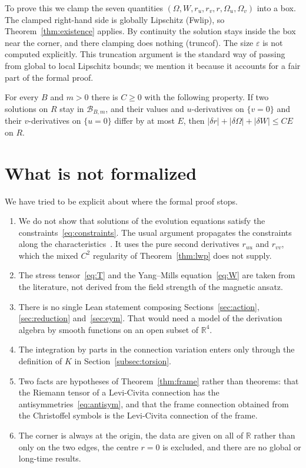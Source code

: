 \documentclass{lmcs}
\DeclareRobustCommand{\lean}[1]{{\ttfamily\def\_{\textunderscore\allowbreak}#1}}
\newcommand{\R}{\mathbb{R}}
\begin{document}
To prove this we clamp the seven quantities $(\Omega,W,r_u,r_v,r,\Omega_u,\Omega_v)$ into a box. The clamped right-hand side is globally Lipschitz (\lean{Fw\_lip}), so Theorem~\ref{thm:existence} applies. By continuity the solution stays inside the box near the corner, and there clamping does nothing (\lean{trunc\_of}). The size $\varepsilon$ is not computed explicitly. This truncation argument is the standard way of passing from global to local Lipschitz bounds; we mention it because it accounts for a fair part of the formal proof.

\begin{thm}[Lipschitz dependence, \lean{eym\_dependence}]\label{thm:eymdep}
For every $B$ and $m>0$ there is $C\ge0$ with the following property. If two solutions on $R$ stay in $\mathcal B_{B,m}$, and their values and $u$-derivatives on $\{v=0\}$ and their $v$-derivatives on $\{u=0\}$ differ by at most $E$, then $|\delta r|+|\delta\Omega|+|\delta W|\le CE$ on $R$.
\end{thm}

\section{What is not formalized}\label{sec:scope}

We have tried to be explicit about where the formal proof stops.
\begin{enumerate}
\item We do not show that solutions of the evolution equations satisfy the constraints~\eqref{eq:constraints}. The usual argument propagates the constraints along the characteristics~\cite{Christodoulou1986,Dafermos2005}. It uses the pure second derivatives $r_{uu}$ and $r_{vv}$, which the mixed $C^2$ regularity of Theorem~\ref{thm:lwp} does not supply.
\item The stress tensor~\eqref{eq:T} and the Yang--Mills equation~\eqref{eq:W} are taken from the literature, not derived from the field strength of the magnetic ansatz.
\item There is no single Lean statement composing Sections~\ref{sec:action}, \ref{sec:reduction} and~\ref{sec:eym}. That would need a model of the derivation algebra by smooth functions on an open subset of $\R^4$.
\item The integration by parts in the connection variation enters only through the definition of $K$ in Section~\ref{subsec:torsion}.
\item Two facts are hypotheses of Theorem~\ref{thm:frame} rather than theorems: that the Riemann tensor of a Levi-Civita connection has the antisymmetries~\eqref{eq:antisym}, and that the frame connection obtained from the Christoffel symbols is the Levi-Civita connection of the frame.
\item The corner is always at the origin, the data are given on all of $\R$ rather than only on the two edges, the centre $r=0$ is excluded, and there are no global or long-time results.
\end{enumerate}
\end{document}
